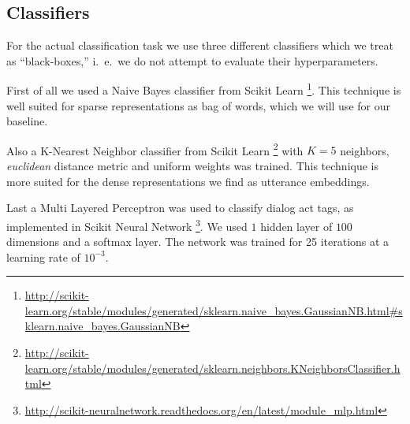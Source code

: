 

\subsection{Classifiers}
For the actual classification task we use three different classifiers which we treat as ``black-boxes,'' i.\ e.\ we do not attempt to evaluate their hyperparameters. 

First of all we used a Naive Bayes classifier  from Scikit Learn \footnote{\url{http://scikit-learn.org/stable/modules/generated/sklearn.naive_bayes.GaussianNB.html#sklearn.naive_bayes.GaussianNB}}. This technique is well suited for sparse representations as bag of words, which we will use for our baseline. 

Also a K-Nearest Neighbor classifier from Scikit Learn \footnote{\url{http://scikit-learn.org/stable/modules/generated/sklearn.neighbors.KNeighborsClassifier.html}} with $K=5$ neighbors, \emph{euclidean} distance metric and uniform weights was trained. This technique is more suited for the dense representations we find as utterance embeddings.

Last a Multi Layered Perceptron was used to classify dialog act tags, as implemented in Scikit Neural Network \footnote{\url{http://scikit-neuralnetwork.readthedocs.org/en/latest/module_mlp.html}}. We used $1$ hidden layer of $100$ dimensions and a softmax layer. The network was trained for 25 iterations at a learning rate of $10^{-3}$.
